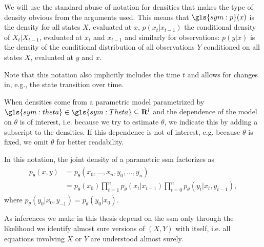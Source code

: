 \begin{notation}
    \label{not:densities}
    We will use the standard abuse of notation for densities that makes the type of density \glqq{}obvious\grqq{} from the arguments used.
    This means that $\gls{sym:p}(x)$ is the density for all states $X$, evaluated at $x$, $p(x_t|x_{t - 1})$ the conditional density of $X_t|X_{t - 1}$, evaluated at $x_{t}$ and $x_{t - 1}$ and similarly for observations: $p(y|x)$ is the density of the conditional distribution of all observations $Y$ conditioned on all states $X$, evaluated at $y$ and $x$.

    Note that this notation also implicitly includes the time $t$ and allows for changes in, e.g., the state transition over time.

    When densities come from a parametric model parametrized by $\gls{sym:theta}\in \gls{sym:Theta} \subseteq \mathbf{R}^{l}$ and the dependence of the model on $\theta$ is of interest, i.e. because we try to estimate $\theta$, we indicate this by adding a subscript to the densities.
    If this dependence is not of interest, e.g. because $\theta$ is fixed, we omit $\theta$ for better readability.

    In this notation, the joint density of a parametric \gls{ssm} factorizes as
    \begin{align}
        \label{eq:joint_density}
        \begin{split}
        p_\theta(x,y) & = p_\theta(x_0, \dots, x_{n}, y_0, \dots, y_{n})                                                              \\
                      & = p_\theta (x_0)\prod_{t = 1}^{n} p_\theta(x_{t}|x_{t - 1}) \prod_{t = 0}^{n} p_\theta(y_t | x_t, y_{t - 1}),
        \end{split}
    \end{align}
    where $p_\theta(y_0|x_0, y_{-1}) = p_\theta(y_0| x_0)$.

    As inferences we make in this thesis depend on the \gls{ssm} only through the likelihood we identify almost sure versions of $(X, Y)$ with itself, i.e. all equations involving $X$ or $Y$ are understood almost surely.
\end{notation}

